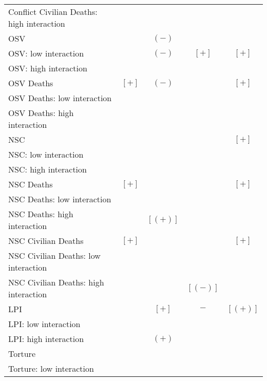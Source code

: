 \begin{table}[!htbp]
\begin{tabular}{lc|c|c|c}
\qquad Conflict Civilian Deaths: high interaction &       &         &         & \\
OSV                                               &       & $(-)$   &         & \\
\qquad OSV: low interaction                       &       & $(-)$   & $[+]$   & $[+]$ \\
\qquad OSV: high interaction                      &       &         &         & \\
OSV Deaths                                        & $[+]$ & $(-)$   &         & $[+]$ \\
\qquad OSV Deaths: low interaction                &       &         &         & \\
\qquad OSV Deaths: high interaction               &       &         &         & \\
NSC                                               &       &         &         & $[+]$ \\
\qquad NSC: low interaction                       &       &         &         & \\
\qquad NSC: high interaction                      &       &         &         & \\
NSC Deaths                                        & $[+]$ &         &         & $[+]$ \\
\qquad NSC Deaths: low interaction                &       &         &         & \\
\qquad NSC Deaths: high interaction               &       & $[(+)]$ &         & \\
NSC Civilian Deaths                               & $[+]$ &         &         & $[+]$ \\
\qquad NSC Civilian Deaths: low interaction       &       &         &         & \\
\qquad NSC Civilian Deaths: high interaction      &       &         & $[(-)]$ & \\
LPI                                               &       & $[+]$   & $-$     & $[(+)]$ \\
\qquad LPI: low interaction                       &       &         &         & \\
\qquad LPI: high interaction                      &       & $(+)$   &         & \\
Torture                                           &       &         &         & \\
\qquad Torture: low interaction                   &       &         &         &   \\

\end{tabular}
\end{table}
